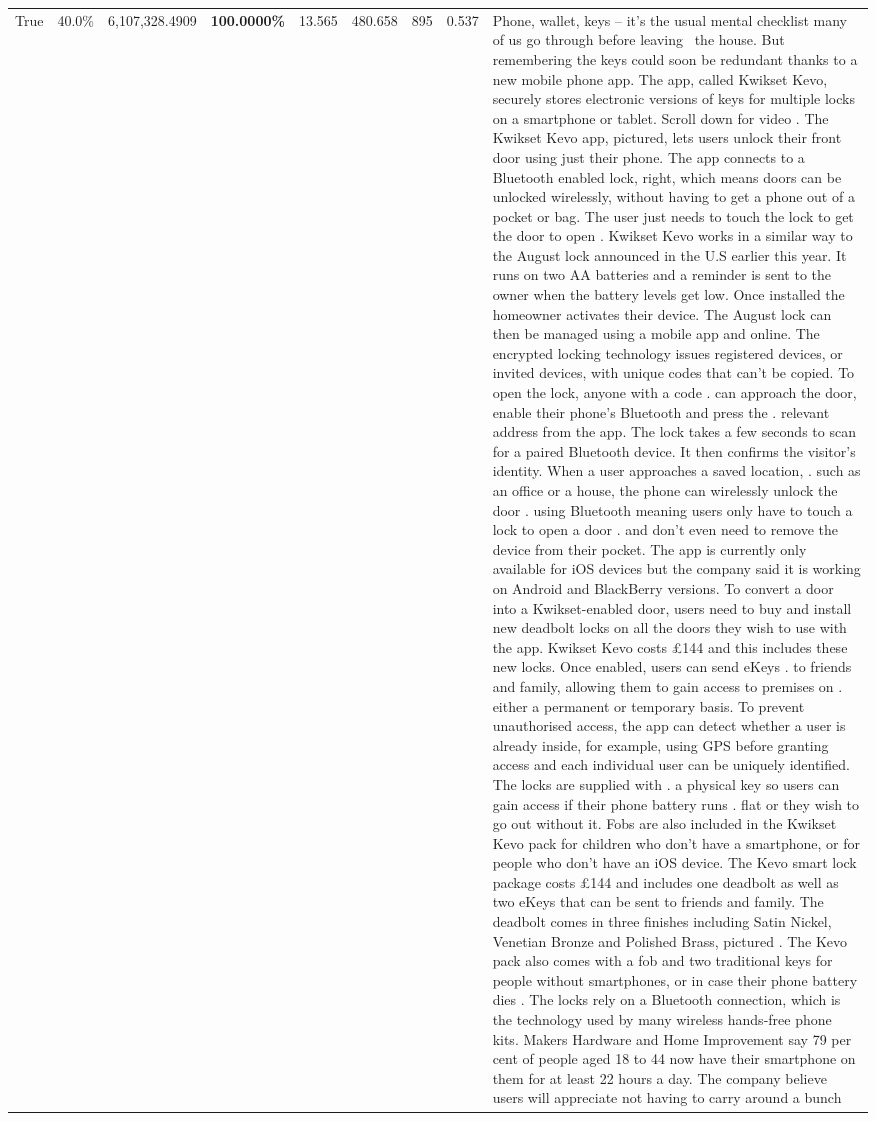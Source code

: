\begin{table}[H]
\begin{tabular}{lllrlllll}
True & 40.0\% & 6,107,328.4909 & \bfseries \color{red} 100.0000\% & 13.565 & 480.658 & 895 & 0.537 & Phone, wallet, keys – it’s the usual mental checklist many of us go through before leaving  the house. But remembering the keys could soon be redundant thanks to a new mobile phone app. The app, called Kwikset Kevo, securely stores electronic versions of keys for multiple locks on a smartphone or tablet. Scroll down for video . The Kwikset Kevo app, pictured, lets users unlock their front door using just their phone. The app connects to a Bluetooth enabled lock, right, which means doors can be unlocked wirelessly, without having to get a phone out of a pocket or bag. The user just needs to touch the lock to get the door to open . Kwikset Kevo works in a similar way to the August lock announced in the U.S earlier this year. It runs on two AA batteries and a reminder is sent to the owner when the battery levels get low. Once installed the homeowner activates their device. The August lock can then be managed using a mobile app and online. The encrypted locking technology issues registered devices, or invited devices, with unique codes that can't be copied. To open the lock, anyone with a code . can approach the door, enable their phone's Bluetooth and press the . relevant address from the app. The lock takes a few seconds to scan for a paired Bluetooth device. It then confirms the visitor's identity. When a user approaches a saved location, . such as an office or a house, the phone can wirelessly unlock the door . using Bluetooth meaning users only have to touch a lock to open a door . and don't even need to remove the device from their pocket. The app is currently only available for iOS devices but the company said it is working on Android and BlackBerry versions. To convert a door into a Kwikset-enabled door, users need to buy and install new deadbolt locks on all the doors they wish to use with the app. Kwikset Kevo costs £144 and this includes these new locks. Once enabled, users can send eKeys . to friends and family, allowing them to gain access to premises on . either a permanent or temporary basis. To prevent unauthorised access, the app can detect whether a user is already inside, for example, using GPS before granting access and each individual user can be uniquely identified. The locks are supplied with . a physical key so users can gain access if their phone battery runs . flat or they wish to go out without it. Fobs are also included in the Kwikset Kevo pack for children who don't have a smartphone, or for people who don't have an iOS device. The Kevo smart lock package costs £144 and includes one deadbolt as well as two eKeys that can be sent to friends and family. The deadbolt comes in three finishes including Satin Nickel, Venetian Bronze and Polished Brass, pictured . The Kevo pack also comes with a fob and two traditional keys for people without smartphones, or in case their phone battery dies . The locks rely on a Bluetooth connection, which is the technology used by many wireless hands-free phone kits. Makers Hardware and Home Improvement say 79 per cent of people aged 18 to 44 now have their smartphone on them for at least 22 hours a day. The company believe users will appreciate not having to carry around a bunch 
\end{tabular}
\end{table}
